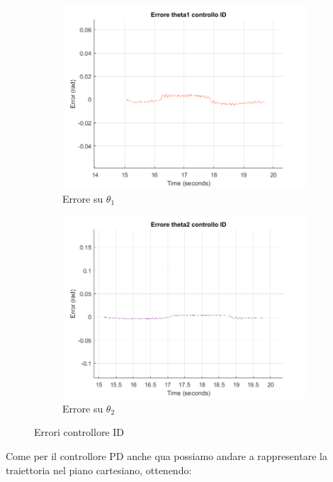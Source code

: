 \begin{figure}
\begin{subfigure}{.53\textwidth}
  \centering
  \includegraphics[width=.8\linewidth]{Immagini/Traiettorie/ErroreTheta1ID}  
  \caption{Errore su $\theta_1$}
  \label{fig:sub-pd3k}
\end{subfigure}
\begin{subfigure}{.5\textwidth}
  \centering
  \includegraphics[width=.8\linewidth]{Immagini/Traiettorie/ErroreTheta2ID}  
  \caption{Errore su $\theta_2$}
  \label{fig:sub-pd4}
\end{subfigure}
\caption{Errori controllore ID}
\label{fig:AndamentiID}
\end{figure}
Come per il controllore PD anche qua possiamo andare a rappresentare la traiettoria nel piano cartesiano, ottenendo:

